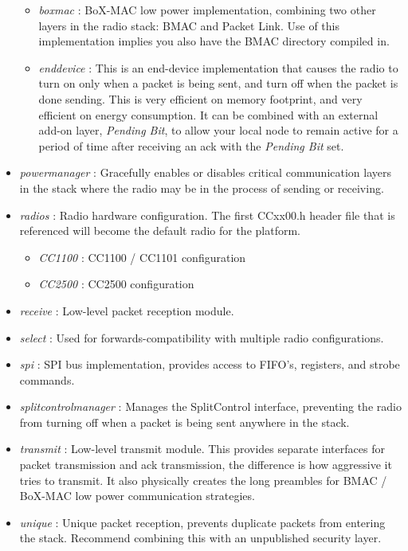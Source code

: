\documentclass{article}
\begin{document}
\begin{itemize}
\begin{itemize}
	    \item \emph{boxmac} : BoX-MAC \cite{boxmac} low power implementation, combining two other
	    layers in the radio stack:  BMAC and Packet Link. Use of this implementation
	    implies you also have the BMAC directory compiled in.
	    \item \emph{enddevice} : This is an end-device implementation that causes
	    the radio to turn on only when a packet is being sent, and turn off when
	    the packet is done sending.  This is very efficient on memory footprint, and 
	    very efficient on energy consumption. It can be combined with an external 
	    add-on layer, \emph{Pending Bit}, to allow your local node to remain active 
	    for a period of time after receiving an ack with the \emph{Pending Bit} set.
	  \end{itemize}
	\item \emph{powermanager} : Gracefully enables or disables critical communication 
	layers in the stack where the radio may be in the process of sending or receiving.
	\item \emph{radios} : Radio hardware configuration. The first CCxx00.h header file
	that is referenced will become the default radio for the platform.
	  \begin{itemize}
	    \item \emph{CC1100} : CC1100 / CC1101 configuration
	    \item \emph{CC2500} : CC2500 configuration
	  \end{itemize}
	\item \emph{receive} : Low-level packet reception module.
	\item \emph{select} : Used for forwards-compatibility with multiple radio 
	configurations.
	\item \emph{spi} : SPI bus implementation, provides access to FIFO's, registers, and 
	strobe commands.
	\item \emph{splitcontrolmanager} : Manages the SplitControl interface, preventing
	the radio from turning off when a packet is being sent anywhere in the stack.
	\item \emph{transmit} : Low-level transmit module. This provides separate interfaces 
	for packet transmission and ack transmission, the difference is how aggressive it 
	tries to transmit. It also physically creates the long preambles for BMAC / BoX-MAC 
	low power communication strategies.
	\item \emph{unique} : Unique packet reception, prevents duplicate packets from 
	entering the stack. Recommend combining this with an unpublished security layer.
\end{itemize}
\end{document}
